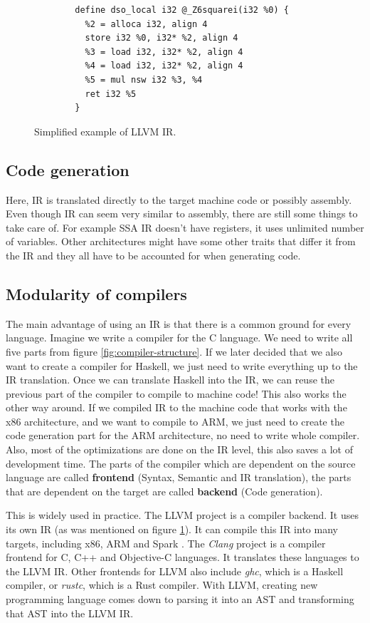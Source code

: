 \begin{figure}\label{fig:llvm-ir-example}
    \begin{verbatim}
        define dso_local i32 @_Z6squarei(i32 %0) {
          %2 = alloca i32, align 4
          store i32 %0, i32* %2, align 4
          %3 = load i32, i32* %2, align 4
          %4 = load i32, i32* %2, align 4
          %5 = mul nsw i32 %3, %4
          ret i32 %5
        }
    \end{verbatim}
    \caption{Simplified example of LLVM IR.}
\end{figure}

\subsection{Code generation}
Here, IR is translated directly to the target machine code or possibly
assembly. Even though IR can seem very similar to assembly, there are still
some things to take care of. For example SSA IR doesn't have registers, it uses
unlimited number of variables. Other architectures might have some other traits
that differ it from the IR and they all have to be accounted for when
generating code.

\subsection{Modularity of compilers}
The main advantage of using an IR is that there is a common ground for every
language. Imagine we write a compiler for the C language. We need to write all
five parts from figure \ref{fig:compiler-structure}. If we later decided that
we also want to create a compiler for Haskell, we just need to write everything
up to the IR translation. Once we can translate Haskell into the IR, we can
reuse the previous part of the compiler to compile to machine code! This also
works the other way around. If we compiled IR to the machine code that works
with the x86 architecture, and we want to compile to ARM, we just need to
create the code generation part for the ARM architecture, no need to write
whole compiler. Also, most of the optimizations are done on the IR level, this
also saves a lot of development time. The parts of the compiler which are
dependent on the source language are called \textbf{frontend} (Syntax, Semantic
and IR translation), the parts that are dependent on the target are called
\textbf{backend} (Code generation).

This is widely used in practice. The LLVM \cite{llvm} project is a compiler
backend. It uses its own IR (as was mentioned on figure
\ref{fig:llvm-ir-example}). It can compile this IR into many targets, including
x86, ARM and Spark . The \textit{Clang} project is a compiler
frontend for C, C++ and Objective-C languages. It translates these languages to
the LLVM IR. Other frontends for LLVM also include \textit{ghc}, which is a
Haskell compiler, or \textit{rustc}, which is a Rust compiler. With LLVM,
creating new programming language comes down to parsing it into an AST and
transforming that AST into the LLVM IR.

